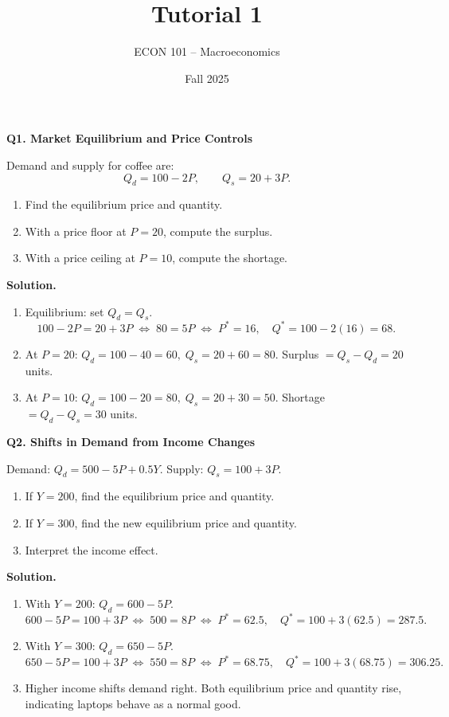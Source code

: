 \documentclass[11pt]{article}
\title{Tutorial 1}
\author{ECON 101 -- Macroeconomics}
\date{Fall 2025}
\newcommand{\eq}{\Leftrightarrow}
\begin{document}
\maketitle



\noindent \textbf{Q1. Market Equilibrium and Price Controls}

Demand and supply for coffee are:
\[
Q_d=100-2P,\qquad Q_s=20+3P.
\]
\begin{enumerate}[label=(\alph*)]
\item Find the equilibrium price and quantity.
\item With a price floor at \(P=20\), compute the surplus.
\item With a price ceiling at \(P=10\), compute the shortage.
\end{enumerate}

\textbf{Solution.}
\begin{enumerate}[label=(\alph*)]
\item Equilibrium: set \(Q_d=Q_s\).
\[
100-2P=20+3P \;\eq\; 80=5P \;\eq\; P^\ast=16,\quad Q^\ast=100-2(16)=68.
\]
\item At \(P=20\): \(Q_d=100-40=60,\; Q_s=20+60=80\).
Surplus \(=Q_s-Q_d=20\) units.
\item At \(P=10\): \(Q_d=100-20=80,\; Q_s=20+30=50\).
Shortage \(=Q_d-Q_s=30\) units.
\end{enumerate}

\bigskip

\noindent \textbf{Q2. Shifts in Demand from Income Changes}

Demand: \(Q_d=500-5P+0.5Y\). Supply: \(Q_s=100+3P\).
\begin{enumerate}[label=(\alph*)]
\item If \(Y=200\), find the equilibrium price and quantity.
\item If \(Y=300\), find the new equilibrium price and quantity.
\item Interpret the income effect.
\end{enumerate}

\textbf{Solution.}
\begin{enumerate}[label=(\alph*)]
\item With \(Y=200\): \(Q_d=600-5P\).
\[
600-5P=100+3P \;\eq\; 500=8P \;\eq\; P^\ast=62.5,\quad Q^\ast=100+3(62.5)=287.5.
\]
\item With \(Y=300\): \(Q_d=650-5P\).
\[
650-5P=100+3P \;\eq\; 550=8P \;\eq\; P^\ast=68.75,\quad Q^\ast=100+3(68.75)=306.25.
\]
\item Higher income shifts demand right. Both equilibrium price and quantity rise, indicating laptops behave as a normal good.
\end{enumerate}
\end{document}
